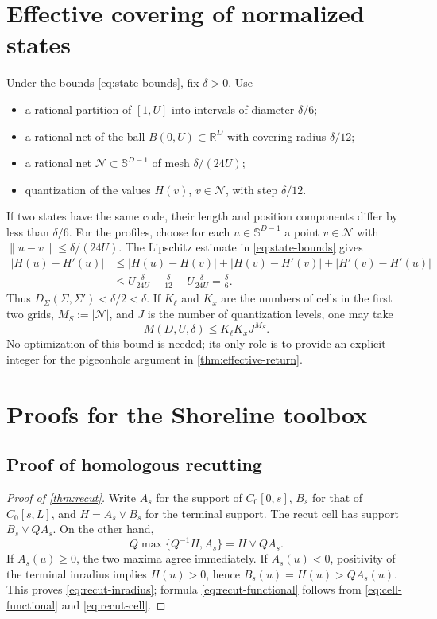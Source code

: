 \documentclass[10pt,a4paper]{article}
\theoremstyle{definition}
\theoremstyle{remark}
\newcommand{\R}{\mathbb{R}}
\newcommand{\Sph}{\mathbb{S}}
\newcommand{\norm}[1]{\lVert #1\rVert}
\newcommand{\abs}[1]{\lvert #1\rvert}
\newcommand{\vmax}{\mathbin{\vee}}
\begin{document}
\appendix
\section{Effective covering of normalized states}
\label{app:covering}
Under the bounds \eqref{eq:state-bounds}, fix $\delta>0$. Use
\begin{itemize}
\item a rational partition of $[1,U]$ into intervals of diameter $\delta/6$;
\item a rational net of the ball $B(0,U)\subset\R^D$ with covering radius $\delta/12$;
\item a rational net $\mathcal N\subset\Sph^{D-1}$ of mesh $\delta/(24U)$;
\item quantization of the values $H(v)$, $v\in\mathcal N$, with step $\delta/12$.
\end{itemize}
If two states have the same code, their length and position components differ by less than $\delta/6$. For the profiles, choose for each $u\in\Sph^{D-1}$ a point $v\in\mathcal N$ with $\norm{u-v}\le\delta/(24U)$. The Lipschitz estimate in \eqref{eq:state-bounds} gives
\begin{align*}
\abs{H(u)-H'(u)}
&\le\abs{H(u)-H(v)}+\abs{H(v)-H'(v)}+\abs{H'(v)-H'(u)}\\
&\le U\frac{\delta}{24U}+\frac{\delta}{12}+U\frac{\delta}{24U}
=\frac{\delta}{6}.
\end{align*}
Thus $D_\Sigma(\Sigma,\Sigma')<\delta/2<\delta$. If $K_\ell$ and $K_x$ are the numbers of cells in the first two grids, $M_S:=\abs{\mathcal N}$, and $J$ is the number of quantization levels, one may take
\[
M(D,U,\delta)\le K_\ell K_x J^{M_S}.
\]
No optimization of this bound is needed; its only role is to provide an explicit integer for the pigeonhole argument in \cref{thm:effective-return}.

\section{Proofs for the Shoreline toolbox}
\label{app:toolbox-proofs}
\subsection{Proof of homologous recutting}
\label{app:recut-proof}
\begin{proof}[Proof of \cref{thm:recut}]
Write $A_s$ for the support of $C_0[0,s]$, $B_s$ for that of $C_0[s,L]$, and $H=A_s\vmax B_s$ for the terminal support. The recut cell has support $B_s\vmax QA_s$. On the other hand,
\[
Q\max\{Q^{-1}H,A_s\}=H\vmax QA_s.
\]
If $A_s(u)\ge0$, the two maxima agree immediately. If $A_s(u)<0$, positivity of the terminal inradius implies $H(u)>0$, hence $B_s(u)=H(u)>QA_s(u)$. This proves \eqref{eq:recut-inradius}; formula \eqref{eq:recut-functional} follows from \eqref{eq:cell-functional} and \eqref{eq:recut-cell}.
\end{proof}
\end{document}
